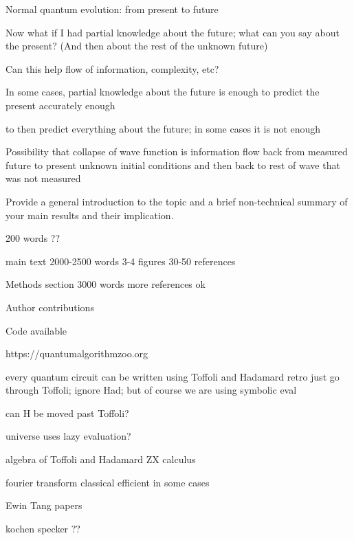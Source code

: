 \documentclass{article}
\begin{document}
\begin{refsection}
   Normal quantum evolution: from present to future

   Now what if I had partial knowledge about the future; what can you
   say about the present?  (And then about the rest of the unknown
   future)

   Can this help flow of information, complexity, etc?  

   In some cases, partial knowledge about the future is enough to
   predict the present accurately enough

   to then predict everything about the future; in some cases it is not enough

   Possibility that collapse of wave function is information flow back
   from measured future to present unknown initial conditions and then
   back to rest of wave that was not measured


Provide a general introduction to the topic and a brief non-technical
summary of your main results and their implication.

200 words ??

main text
  2000-2500 words
  3-4 figures
  30-50 references

Methods section
  3000 words
  more references ok
  
Author contributions

Code available  

https://quantumalgorithmzoo.org

every quantum circuit can be written using Toffoli and Hadamard
retro just go through Toffoli; ignore Had; but of course we are using symbolic eval

can H be moved past Toffoli?

universe uses lazy evaluation?

algebra of Toffoli and Hadamard
ZX calculus

fourier transform classical efficient in some cases

Ewin Tang papers

kochen specker ??

\printbibliography[heading=subbibliography]
\end{refsection}
\end{document}
